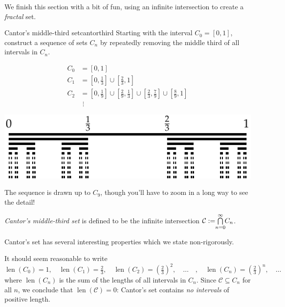 
\goodbreak


 We finish this section with a bit of fun, using an infinite intersection to create a \emph{fractal} set.

\begin{example}{Cantor's middle-third set}{cantorthird}
	Starting with the interval $C_0=[0,1]$, construct a sequence of sets $C_n$ by repeatedly removing the middle third of all intervals in $C_n$.\par
	
	\begin{minipage}[t]{0.45\linewidth}\vspace{-15pt}
		\begin{align*}
			C_0&=[0,1]\\
			C_1&=[0,\tfrac 13]\cup [\tfrac 23,1]\\
			C_2&=[0,\tfrac 19]\cup [\tfrac 29,\tfrac 13]
			\cup [\tfrac 23,\tfrac 79]\cup [\tfrac 89,1]\\
			&\mathrel{\,\,\vdots}
		\end{align*}
	\end{minipage}
	\hfill
	\begin{minipage}[t]{0.54\linewidth}\vspace{-10pt}
		\hfill \href{http://www.math.uci.edu/~ndonalds/math13/cantoranim.html}{\includegraphics{setsii-02-cantor}}
	\end{minipage}
	\par

	The sequence is drawn up to $C_9$, though you'll have to zoom in a long way to see the detail!\par

	\emph{Cantor's middle-third set} is defined to be the infinite intersection $\mathcal C:=\negthickspace\bigcap\limits_{n=0}^\infty\negthickspace C_n$.\par

	Cantor's set has several interesting properties which we state non-rigorously.
	\begin{description}\itemsep2pt
		\item[Zero Measure (length)] It should seem reasonable to write
		\[
			\operatorname{len}(C_0)=1,\quad 
			\operatorname{len}(C_1)=\tfrac 23,\quad
			\operatorname{len}(C_2)=\left(\tfrac 23\right)^2,\quad 
			\ldots\quad ,\quad 
			\operatorname{len}(C_n)=\left(\tfrac 23\right)^n,\quad\ldots
		\]
		where $\operatorname{len}(C_n)$ is the sum of the lengths of all intervals in $C_n$. Since $\mathcal C\subseteq C_n$ for all $n$, we conclude that $\operatorname{len}(\mathcal C)=0$: Cantor's set contains \emph{no intervals} of positive length.
	

\end{description}
\end{example}
